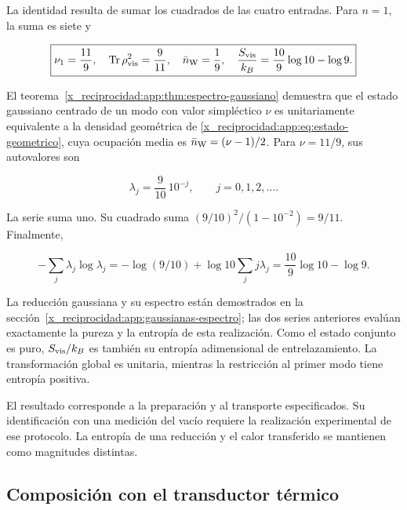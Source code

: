 La identidad resulta de sumar los cuadrados de las cuatro entradas. Para \(n=1\), la suma es siete y



\begin{equation}
\boxed{\nu_1=\frac{11}{9},\quad
\operatorname{Tr}\rho_{\rm vis}^2=\frac9{11},\quad
\bar n_{\rm W}=\frac19,\quad
\frac{S_{\rm vis}}{k_B}=\frac{10}{9}\log10-\log9.}
\label{x_reciprocidad:nuc12:eq:5.9}
\end{equation}



El teorema~\ref{x_reciprocidad:app:thm:espectro-gaussiano} demuestra que el estado gaussiano centrado de un modo con valor simpléctico \(\nu\) es unitariamente equivalente a la densidad geométrica de \eqref{x_reciprocidad:app:eq:estado-geometrico}, cuya ocupación media es \(\bar n_{\rm W}=(\nu-1)/2\). Para \(\nu=11/9\), sus autovalores son



\begin{equation}
\lambda_j=\frac9{10}\,10^{-j},\qquad j=0,1,2,\ldots.
\label{x_reciprocidad:nuc12:eq:5.10}
\end{equation}



La serie suma uno. Su cuadrado suma
\((9/10)^2/(1-10^{-2})=9/11\). Finalmente,


\[
-\sum_j\lambda_j\log\lambda_j
=-\log(9/10)+\log10\sum_jj\lambda_j
=\frac{10}{9}\log10-\log9.
\]



La reducción gaussiana y su espectro están demostrados en la sección~\ref{x_reciprocidad:app:gaussianas-espectro}; las dos series anteriores evalúan exactamente la pureza y la entropía de esta realización. Como el estado conjunto es puro, \(S_{\rm vis}/k_B\) es también su entropía adimensional de entrelazamiento. La transformación global es unitaria, mientras la restricción al primer modo tiene entropía positiva.

El resultado corresponde a la preparación y al transporte especificados. Su identificación con una medición del vacío requiere la realización experimental de ese protocolo. La entropía de una reducción y el calor transferido se mantienen como magnitudes distintas.

\subsection{Composición con el transductor térmico}

